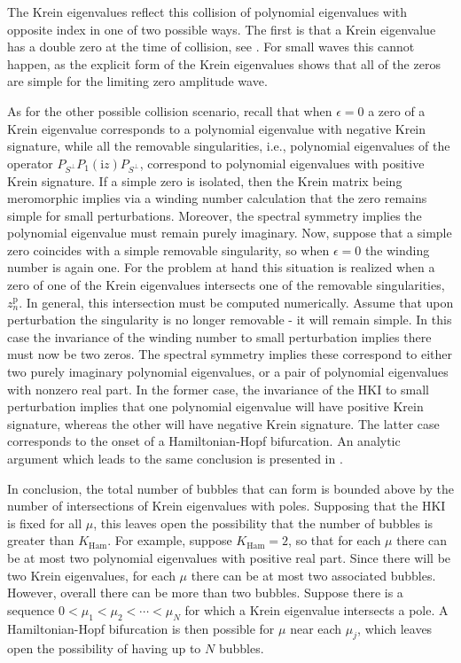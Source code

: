 \documentclass[review,onefignum,onetabnum]{siamart171218}
\def\Ham{\mathop\mathrm{Ham}\nolimits}
\newcommand{\rmi}{\mathrm{i}}
\newcommand{\rmp}{\mathrm{p}}
\begin{document}
The Krein eigenvalues reflect this collision of polynomial eigenvalues with opposite index in one of two possible ways. The
first is that a Krein eigenvalue has a double zero at the time of collision,
see \cite[Lemma~2.8]{kapitula:tks10}. For small waves this cannot happen, as
the explicit form of the Krein eigenvalues shows that all of the zeros are
simple for the limiting zero amplitude wave.

As for the other possible collision scenario, recall that when $\epsilon=0$ a
zero of a Krein eigenvalue corresponds to a polynomial eigenvalue with
negative Krein signature, while all the removable singularities, i.e.,
polynomial eigenvalues of the operator $P_{S^\perp}P_1(\rmi z)P_{S^\perp}$,
correspond to polynomial eigenvalues with positive Krein signature. If a
simple zero is isolated, then the Krein matrix being meromorphic implies via
a winding number calculation that the zero remains simple for small
perturbations. Moreover, the spectral symmetry implies the polynomial
eigenvalue must remain purely imaginary. Now, suppose that a simple zero
coincides with a simple removable singularity, so when $\epsilon=0$ the
winding number is again one. For the problem at hand this situation is
realized when a zero of one of the Krein eigenvalues intersects one of the
removable singularities, $z_n^\rmp$. In general, this intersection must be
computed numerically. Assume that upon perturbation the singularity is no
longer removable - it will remain simple. In this case the invariance of the
winding number to small perturbation implies there must now be two zeros. The
spectral symmetry implies these correspond to either two purely imaginary
polynomial eigenvalues, or a pair of polynomial eigenvalues with nonzero real
part. In the former case, the invariance of the HKI to small perturbation
implies that one polynomial eigenvalue will have positive Krein signature,
whereas the other will have negative Krein signature. The latter case
corresponds to the onset of a Hamiltonian-Hopf bifurcation. An analytic
argument which leads to the same conclusion is presented in
\cite[Section~2.4]{kapitula:tks10}.

In conclusion, the total number of bubbles that can form is bounded above by
the number of intersections of Krein eigenvalues with poles. Supposing that
the HKI is fixed for all $\mu$, this leaves open the possibility that the
number of bubbles is greater than $K_{\Ham}$.  For example, suppose
$K_{\Ham}=2$, so that for each $\mu$ there can be at most two polynomial
eigenvalues with positive real part. Since there will be two Krein
eigenvalues, for each $\mu$ there can be at most two associated bubbles.
However, overall there can be more than two bubbles. Suppose there is a
sequence $0<\mu_1<\mu_2<\cdots<\mu_N$ for which a Krein eigenvalue intersects
a pole. A Hamiltonian-Hopf bifurcation is then possible for $\mu$ near each
$\mu_j$, which leaves open the possibility of having up to $N$ bubbles.
\end{document}
